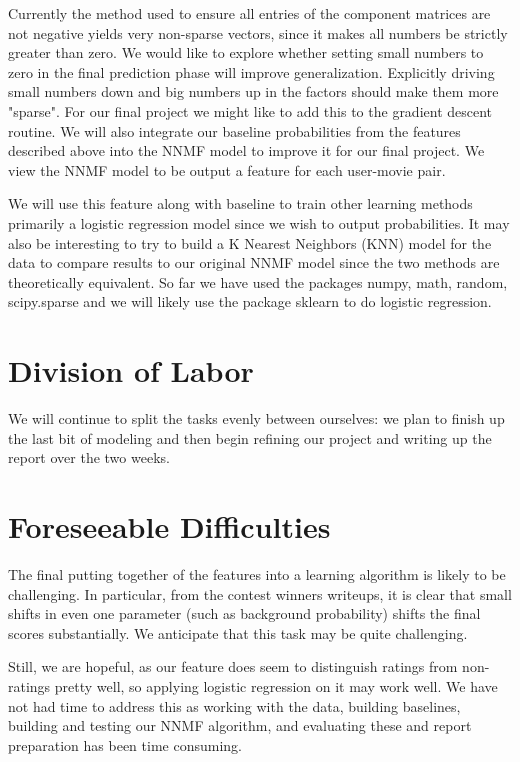 \documentclass[11pt]{article}
\begin{document}
Currently the method used to ensure all entries of the component
matrices are not negative yields very non-sparse vectors, since it
makes all numbers be strictly greater than zero. We would like to
explore whether setting small numbers to zero in the final prediction
phase will improve generalization.  Explicitly driving small numbers
down and big numbers up in the factors should make them more
"sparse". For our final project we might like to add this to the
gradient descent routine. We will also integrate our baseline
probabilities from the features described above into the NNMF model to
improve it for our final project.  We view the NNMF model to be output
a feature for each user-movie pair.

We will use this feature along with baseline to train other learning
methods primarily a logistic regression model since we wish to output
probabilities. It may also be interesting to try to build a K Nearest
Neighbors (KNN) model for the data to compare results to our original
NNMF model since the two methods are theoretically equivalent. So far
we have used the packages numpy, math, random, scipy.sparse and we
will likely use the package sklearn to do logistic regression.

\section{Division of Labor}

We will continue to split the tasks evenly between ourselves: we plan
to finish up the last bit of modeling and then begin refining our
project and writing up the report over the two weeks.

\section{Foreseeable Difficulties}

The final putting together of the features into a learning
algorithm is likely to be challenging.  In particular, 
from the contest winners writeups, it is clear that
small shifts in even one parameter (such as background
probability) shifts the final scores substantially.
We anticipate that this task may be quite challenging.

Still, we are hopeful, as our feature does seem
to distinguish ratings from non-ratings pretty well,
so applying logistic regression on it may work
well.  We have not had time to address this
as working with the data, building baselines, building and testing
our NNMF algorithm, and evaluating these and report
preparation has been time consuming. 
\end{document}
